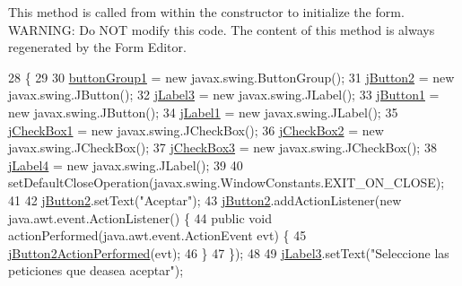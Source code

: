 This method is called from within the constructor to initialize the form. W\+A\+R\+N\+I\+NG\+: Do N\+OT modify this code. The content of this method is always regenerated by the Form Editor. 
\begin{DoxyCode}
28                                   \{
29 
30         \mbox{\hyperlink{classsoftware_1_1_aceptar_peticiones_a6530d813f8beb36dd957644716c9a51e}{buttonGroup1}} = \textcolor{keyword}{new} javax.swing.ButtonGroup();
31         \mbox{\hyperlink{classsoftware_1_1_aceptar_peticiones_ac78871be271223b0cf33bcee93b44687}{jButton2}} = \textcolor{keyword}{new} javax.swing.JButton();
32         \mbox{\hyperlink{classsoftware_1_1_aceptar_peticiones_af8e9b26223cf00481a430c6780ffef22}{jLabel3}} = \textcolor{keyword}{new} javax.swing.JLabel();
33         \mbox{\hyperlink{classsoftware_1_1_aceptar_peticiones_a0dbb46cb648a55e144e5334959c9a068}{jButton1}} = \textcolor{keyword}{new} javax.swing.JButton();
34         \mbox{\hyperlink{classsoftware_1_1_aceptar_peticiones_a4678a7287858835aca98294897b6e05c}{jLabel1}} = \textcolor{keyword}{new} javax.swing.JLabel();
35         \mbox{\hyperlink{classsoftware_1_1_aceptar_peticiones_aaa4f8e7bc9bf52be8ee72e4baf0ccce6}{jCheckBox1}} = \textcolor{keyword}{new} javax.swing.JCheckBox();
36         \mbox{\hyperlink{classsoftware_1_1_aceptar_peticiones_aedf3e1a05531ef046c98a870dfe5f898}{jCheckBox2}} = \textcolor{keyword}{new} javax.swing.JCheckBox();
37         \mbox{\hyperlink{classsoftware_1_1_aceptar_peticiones_a7b914f4724640bc95273e5119651f9a7}{jCheckBox3}} = \textcolor{keyword}{new} javax.swing.JCheckBox();
38         \mbox{\hyperlink{classsoftware_1_1_aceptar_peticiones_ae9e89fa13ccf9f0b425175204554f58c}{jLabel4}} = \textcolor{keyword}{new} javax.swing.JLabel();
39 
40         setDefaultCloseOperation(javax.swing.WindowConstants.EXIT\_ON\_CLOSE);
41 
42         \mbox{\hyperlink{classsoftware_1_1_aceptar_peticiones_ac78871be271223b0cf33bcee93b44687}{jButton2}}.setText(\textcolor{stringliteral}{"Aceptar"});
43         \mbox{\hyperlink{classsoftware_1_1_aceptar_peticiones_ac78871be271223b0cf33bcee93b44687}{jButton2}}.addActionListener(\textcolor{keyword}{new} java.awt.event.ActionListener() \{
44             \textcolor{keyword}{public} \textcolor{keywordtype}{void} actionPerformed(java.awt.event.ActionEvent evt) \{
45                 \mbox{\hyperlink{classsoftware_1_1_aceptar_peticiones_aee913c83480bd79452ad78c860ee2dba}{jButton2ActionPerformed}}(evt);
46             \}
47         \});
48 
49         \mbox{\hyperlink{classsoftware_1_1_aceptar_peticiones_af8e9b26223cf00481a430c6780ffef22}{jLabel3}}.setText(\textcolor{stringliteral}{"Seleccione las peticiones que deasea aceptar"});

\end{DoxyCode}
